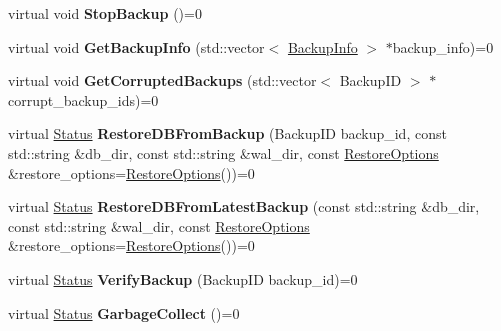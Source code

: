 \begin{DoxyCompactItemize}
\item 
virtual void {\bfseries Stop\+Backup} ()=0\hypertarget{classrocksdb_1_1BackupEngine_a9c8a34b3137c5c090c149cbff9fff8ee}{}\label{classrocksdb_1_1BackupEngine_a9c8a34b3137c5c090c149cbff9fff8ee}

\item 
virtual void {\bfseries Get\+Backup\+Info} (std\+::vector$<$ \hyperlink{structrocksdb_1_1BackupInfo}{Backup\+Info} $>$ $\ast$backup\+\_\+info)=0\hypertarget{classrocksdb_1_1BackupEngine_a52557124fa1a1c7dc1e0220b92d88064}{}\label{classrocksdb_1_1BackupEngine_a52557124fa1a1c7dc1e0220b92d88064}

\item 
virtual void {\bfseries Get\+Corrupted\+Backups} (std\+::vector$<$ Backup\+ID $>$ $\ast$corrupt\+\_\+backup\+\_\+ids)=0\hypertarget{classrocksdb_1_1BackupEngine_a702eb2e414abbf9faaf4065ef29c42e6}{}\label{classrocksdb_1_1BackupEngine_a702eb2e414abbf9faaf4065ef29c42e6}

\item 
virtual \hyperlink{classrocksdb_1_1Status}{Status} {\bfseries Restore\+D\+B\+From\+Backup} (Backup\+ID backup\+\_\+id, const std\+::string \&db\+\_\+dir, const std\+::string \&wal\+\_\+dir, const \hyperlink{structrocksdb_1_1RestoreOptions}{Restore\+Options} \&restore\+\_\+options=\hyperlink{structrocksdb_1_1RestoreOptions}{Restore\+Options}())=0\hypertarget{classrocksdb_1_1BackupEngine_a6ee696a103e180043b815d9446e0f1b4}{}\label{classrocksdb_1_1BackupEngine_a6ee696a103e180043b815d9446e0f1b4}

\item 
virtual \hyperlink{classrocksdb_1_1Status}{Status} {\bfseries Restore\+D\+B\+From\+Latest\+Backup} (const std\+::string \&db\+\_\+dir, const std\+::string \&wal\+\_\+dir, const \hyperlink{structrocksdb_1_1RestoreOptions}{Restore\+Options} \&restore\+\_\+options=\hyperlink{structrocksdb_1_1RestoreOptions}{Restore\+Options}())=0\hypertarget{classrocksdb_1_1BackupEngine_a42887e54bdc224558fb54202fad97c12}{}\label{classrocksdb_1_1BackupEngine_a42887e54bdc224558fb54202fad97c12}

\item 
virtual \hyperlink{classrocksdb_1_1Status}{Status} {\bfseries Verify\+Backup} (Backup\+ID backup\+\_\+id)=0\hypertarget{classrocksdb_1_1BackupEngine_aada26149e972ddce95827806ddd87aeb}{}\label{classrocksdb_1_1BackupEngine_aada26149e972ddce95827806ddd87aeb}

\item 
virtual \hyperlink{classrocksdb_1_1Status}{Status} {\bfseries Garbage\+Collect} ()=0\hypertarget{classrocksdb_1_1BackupEngine_a83526a443b363d59c68e93229c30a63a}{}\label{classrocksdb_1_1BackupEngine_a83526a443b363d59c68e93229c30a63a}

\end{DoxyCompactItemize}
